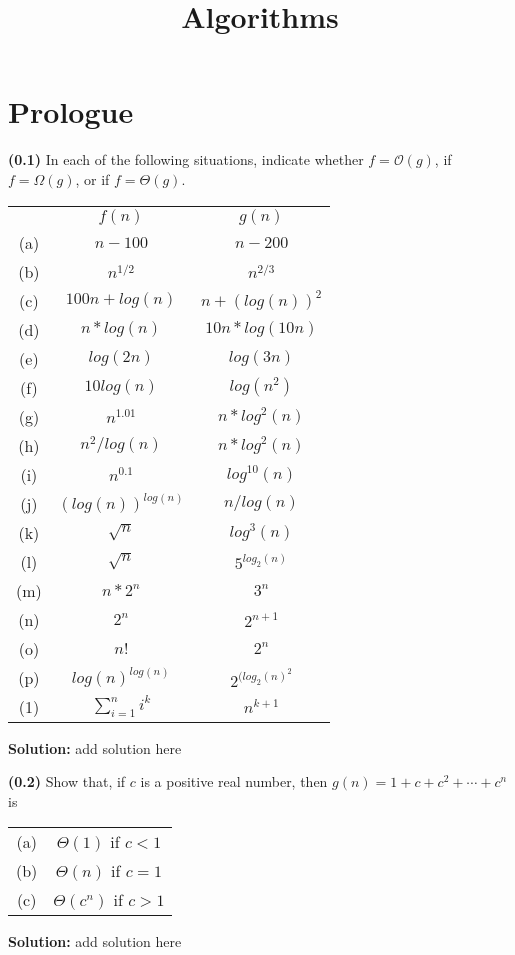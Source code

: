 \documentclass{article}
\title{Algorithms}
\begin{document}
 
\newcommand{\bigO}{\mathcal{O}}
\newcommand{\qa}[3]{\bigskip\noindent\textbf{(#1)} #2

 \bigskip\noindent\textbf{Solution:} #3}

\maketitle %
    
\section{Prologue}
\qa{0.1}
{In each of the following situations, indicate whether $f=\bigO(g)$, if $f=\Omega(g)$, or if $f=\Theta(g)$.

\bigskip\noindent
\begin{tabular}{ ccc } 
 & $f(n)$ & $g(n)$ \\
(a) & $n-100$ & $n-200$ \\ 
(b) & $n^{1/2}$ & $n^{2/3}$ \\ 
(c) & $100n+log(n)$ & $n+(log(n))^2$ \\ 
(d) & $n*log(n)$ & $10n*log(10n)$ \\ 
(e) & $log(2n)$ & $log(3n)$ \\ 
(f) & $10log(n)$ & $log(n^2)$ \\ 
(g) & $n^{1.01}$ & $n*log^2(n)$ \\ 
(h) & $n^{2}/log(n)$ & $n*log^2(n)$ \\ 
(i) & $n^{0.1}$ & $log^{10}(n)$ \\ 
(j) & $(log(n))^{log(n)}$ & $n/log(n)$ \\ 
(k) & $\sqrt{n}$ & $log^3(n)$ \\ 
(l) & $\sqrt{n}$ & $5^{log_2(n)}$ \\ 
(m) & $n*2^n$ & $3^n$ \\ 
(n) & $2^n$ & $2^{n+1}$ \\ 
(o) & $n!$ & $2^n$ \\ 
(p) & $log(n)^{log(n)}$ & $2^{(log_2(n)^2}$ \\ 
(1) & $\sum_{i=1}^{n}i^k$ & $n^{k+1}$ \\ 
\end{tabular}
}{add solution here}

\qa{0.2}
{Show that, if $c$ is a positive real number, then $g(n)=1+c+c^2+\cdots+c^n$ is

\bigskip\noindent
\begin{tabular}{ cc } 
(a) & $\Theta(1)$ if $c<1$ \\ 
(b) & $\Theta(n)$ if $c=1$ \\ 
(c) & $\Theta(c^n)$ if $c>1$ \\ 
\end{tabular}
}
{add solution here}
\end{document}
